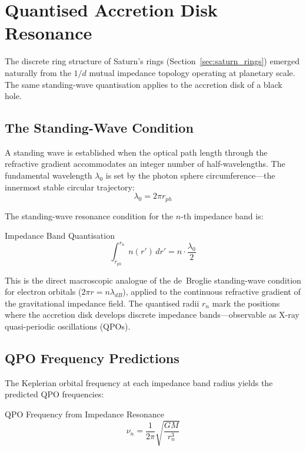 \section{Quantised Accretion Disk Resonance}

The discrete ring structure of Saturn's rings (Section~\ref{sec:saturn_rings}) emerged naturally from the $1/d$ mutual impedance topology operating at planetary scale. The same standing-wave quantisation applies to the accretion disk of a black hole.

\subsection{The Standing-Wave Condition}

A standing wave is established when the optical path length through the refractive gradient accommodates an integer number of half-wavelengths. The fundamental wavelength $\lambda_0$ is set by the photon sphere circumference---the innermost stable circular trajectory:
\begin{equation}
    \lambda_0 = 2\pi r_{ph}
\end{equation}

The standing-wave resonance condition for the $n$-th impedance band is:
\begin{resultbox}{Impedance Band Quantisation}
\begin{equation}
    \int_{r_{ph}}^{r_n} n(r')\, dr' = n \cdot \frac{\lambda_0}{2}
    \label{eq:impedance_quantisation}
\end{equation}
\end{resultbox}

This is the direct macroscopic analogue of the de~Broglie standing-wave condition for electron orbitals ($2\pi r = n\lambda_{dB}$), applied to the continuous refractive gradient of the gravitational impedance field. The quantised radii $r_n$ mark the positions where the accretion disk develops discrete impedance bands---observable as X-ray quasi-periodic oscillations (QPOs).

\subsection{QPO Frequency Predictions}

The Keplerian orbital frequency at each impedance band radius yields the predicted QPO frequencies:
\begin{resultbox}{QPO Frequency from Impedance Resonance}
\begin{equation}
    \nu_n = \frac{1}{2\pi} \sqrt{\frac{GM}{r_n^3}}
\end{equation}
\end{resultbox}

